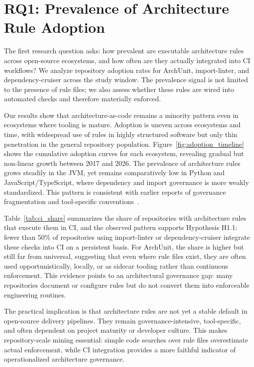 \section{RQ1: Prevalence of Architecture Rule Adoption}\label{sec:rq1}

The first research question asks: how prevalent are executable architecture rules across open-source ecosystems, and how often are they actually integrated into CI workflows? We analyze repository adoption rates for ArchUnit, import-linter, and dependency-cruiser across the study window. The prevalence signal is not limited to the presence of rule files; we also assess whether these rules are wired into automated checks and therefore materially enforced.

Our results show that architecture-as-code remains a minority pattern even in ecosystems where tooling is mature. Adoption is uneven across ecosystems and time, with widespread use of rules in highly structured software but only thin penetration in the general repository population. Figure~\ref{fig:adoption_timeline} shows the cumulative adoption curves for each ecosystem, revealing gradual but non-linear growth between 2017 and 2026. The prevalence of architecture rules grows steadily in the JVM, yet remains comparatively low in Python and JavaScript/TypeScript, where dependency and import governance is more weakly standardized. This pattern is consistent with earlier reports of governance fragmentation and tool-specific conventions~\cite{mujahid2024,perez2024}.

Table~\ref{tab:ci_share} summarizes the share of repositories with architecture rules that execute them in CI, and the observed pattern supports Hypothesis H1.1: fewer than 50\% of repositories using import-linter or dependency-cruiser integrate these checks into CI on a persistent basis. For ArchUnit, the share is higher but still far from universal, suggesting that even where rule files exist, they are often used opportunistically, locally, or as sidecar tooling rather than continuous enforcement. This evidence points to an architectural governance gap: many repositories document or configure rules but do not convert them into enforceable engineering routines.

The practical implication is that architecture rules are not yet a stable default in open-source delivery pipelines. They remain governance-intensive, tool-specific, and often dependent on project maturity or developer culture. This makes repository-scale mining essential: simple code searches over rule files overestimate actual enforcement, while CI integration provides a more faithful indicator of operationalized architecture governance.




